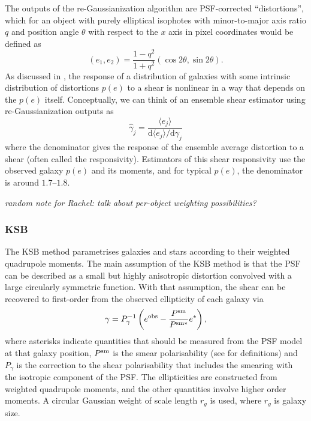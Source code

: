\documentclass[iop]{emulateapj}
\begin{document}
The outputs of the re-Gaussianization algorithm are PSF-corrected ``distortions'', which for an
object with purely elliptical isophotes with minor-to-major axis ratio $q$ and position angle
$\theta$ with respect to the $x$ axis in pixel coordinates would be defined as
\begin{equation}
(e_1, e_2) = \frac{1-q^2}{1+q^2}\left(\cos{2\theta},\sin{2\theta}\right).
\end{equation}
As discussed in \cite{2002AJ....123..583B}, the response of a distribution of galaxies with some intrinsic
distribution of distortions $p(e)$ to a shear is nonlinear in a way that depends on the $p(e)$
itself.  Conceptually, we can think of an ensemble shear estimator using re-Gaussianization outputs
as
\begin{equation}
\hat{\gamma}_j = \frac{\langle e_j\rangle}{\mathrm{d}\langle e_j\rangle/\mathrm{d}\gamma_j}
\end{equation}
where the denominator gives the response of the ensemble average distortion to a shear (often called
the responsivity).  Estimators of this shear responsivity use the observed galaxy $p(e)$ and its
moments, and for typical $p(e)$, the denominator is around $1.7$--$1.8$.

{\em random note for Rachel: talk about per-object weighting possibilities?}

\subsubsection{KSB}

The KSB method \citep{1995ApJ...449..460K} parametrises galaxies and stars according to their
weighted quadrupole moments.  The main assumption of the KSB method is that the PSF 
can be described as a small but highly anisotropic distortion
convolved with a large circularly symmetric function. 
With that assumption, the shear can be recovered to
first-order from the observed ellipticity of each galaxy via
\begin{equation} \label{eqn:weight}
\gamma=P_{\gamma}^{-1}\left(e^{\rm obs}-\frac{P^{\rm sm}}{P^{\rm sm*}}e^{*}\right),
\end{equation}
where asterisks indicate quantities that should be measured from the
PSF model at that galaxy position, $P^{\rm sm}$ is the
smear polarisability (see \citealt{2006MNRAS.368.1323H} for definitions) 
and $P_\gamma$ is the correction to the shear
polarisability that includes the smearing with the isotropic component
of the PSF. The ellipticities are constructed from 
weighted quadrupole moments, and the other quantities involve
higher order moments. A  circular Gaussian weight 
of scale length $r_g$ is used, where $r_g$ is galaxy
size.
\end{document}
